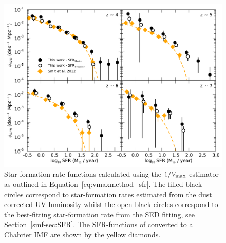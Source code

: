 \begin{figure}
\centering
\includegraphics[width=\textwidth]{plots/fig14.pdf}
\caption[Star-formation rate functions calculated using the $1/V_{\rm{max}}$ estimator as outlined in Equation~\ref{eq:vmaxmethod_sfr}.]{Star-formation rate functions calculated using the $1/V_{\rm{max}}$ estimator as outlined in Equation~\ref{eq:vmaxmethod_sfr}. The filled black circles correspond to star-formation rates estimated from the dust corrected UV luminosity whilst the open black circles correspond to the best-fitting star-formation rate from the SED fitting, see Section~\ref{smf-sec:SFR}. The SFR-functions of \citet{Smit:2012is} converted to a Chabrier IMF are shown by the yellow diamonds.}
\label{smf-fig:sfr_function}
\end{figure}

